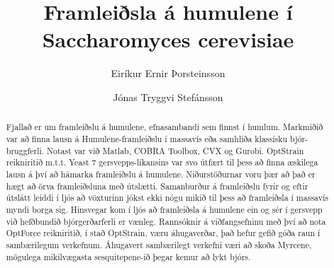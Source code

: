 \documentclass[11pt]{article}
\title{Framleiðsla á humulene í Saccharomyces cerevisiae}
\author{Eiríkur Ernir Þorsteinsson \and Jónas Tryggvi Stefánsson}
\date{}
\begin{document}
\maketitle

\setlength{\columnsep}{1cm}

\begin{abstract}
Fjallað er um framleiðslu á humulene, efnasambandi sem finnst í humlum. Markmiðið var að finna lausn á Humulene-framleiðslu í massavís eða samhliða klassísku bjór-bruggferli. Notast var við Matlab, COBRA Toolbox, CVX og Gurobi.  OptStrain reikniritið m.t.t. Yeast 7 gersvepps-líkansins var svo útfært  til þess að finna æskilega lausn á því að hámarka framleiðslu á humulene. Niðurstöðurnar voru þær að það er hægt að örva framleiðsluna með útslætti. Samanburður á framleiðslu fyrir og eftir útslátt leiddi í ljós að vöxturinn jókst ekki nógu mikið til þess að framleiðsla í massavís myndi borga sig. Hinsvegar kom í ljós að framleiðsla á humulene ein og sér í gersvepp við hefðbundið bjórgerðarferli er vænleg. Rannsóknir á viðfangsefninu með því að nota OptForce reikniritið, í stað OptStrain, væru áhugaverðar, það hefur gefið góða raun í sambærilegum verkefnum. Áhugavert sambærilegt verkefni væri að skoða Myrcene, mögulega mikilvægasta sesquitepene-ið þegar kemur að lykt bjórs.
\end{abstract}
\end{document}
